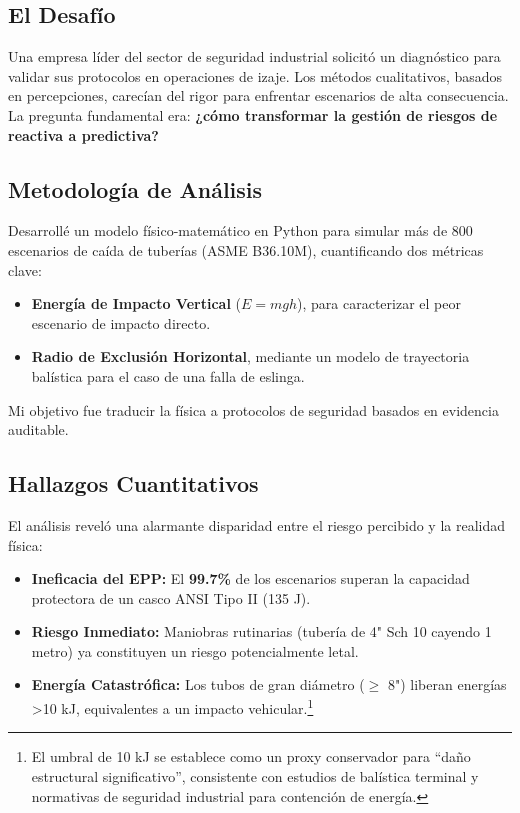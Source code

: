 \documentclass[11pt, a4paper, spanish]{article}
\begin{document}
\subsection*{El Desafío}
Una empresa líder del sector de seguridad industrial solicitó un diagnóstico para validar sus protocolos en operaciones de izaje. Los métodos cualitativos, basados en percepciones, carecían del rigor para enfrentar escenarios de alta consecuencia. La pregunta fundamental era: \textbf{¿cómo transformar la gestión de riesgos de reactiva a predictiva?}

\subsection*{Metodología de Análisis}
Desarrollé un modelo físico-matemático en Python para simular más de 800 escenarios de caída de tuberías (ASME B36.10M), cuantificando dos métricas clave:
\begin{itemize}[leftmargin=*, noitemsep, topsep=1ex]
    \item \textbf{Energía de Impacto Vertical} (\(E = mgh\)), para caracterizar el peor escenario de impacto directo.
    \item \textbf{Radio de Exclusión Horizontal}, mediante un modelo de trayectoria balística para el caso de una falla de eslinga.
\end{itemize}
Mi objetivo fue traducir la física a protocolos de seguridad basados en evidencia auditable.

\subsection*{Hallazgos Cuantitativos}
El análisis reveló una alarmante disparidad entre el riesgo percibido y la realidad física:
\begin{itemize}[leftmargin=*, noitemsep, topsep=1ex]
    \item \textbf{Ineficacia del EPP:} El \textbf{99.7\%} de los escenarios superan la capacidad protectora de un casco ANSI Tipo II (135 J).
    \item \textbf{Riesgo Inmediato:} Maniobras rutinarias (tubería de 4" Sch 10 cayendo 1 metro) ya constituyen un riesgo potencialmente letal.
    \item \textbf{Energía Catastrófica:} Los tubos de gran diámetro ($\geq$ 8") liberan energías >10 kJ, equivalentes a un impacto vehicular.\footnote{El umbral de 10 kJ se establece como un proxy conservador para ``daño estructural significativo'', consistente con estudios de balística terminal y normativas de seguridad industrial para contención de energía.}
\end{itemize}
\end{document}
